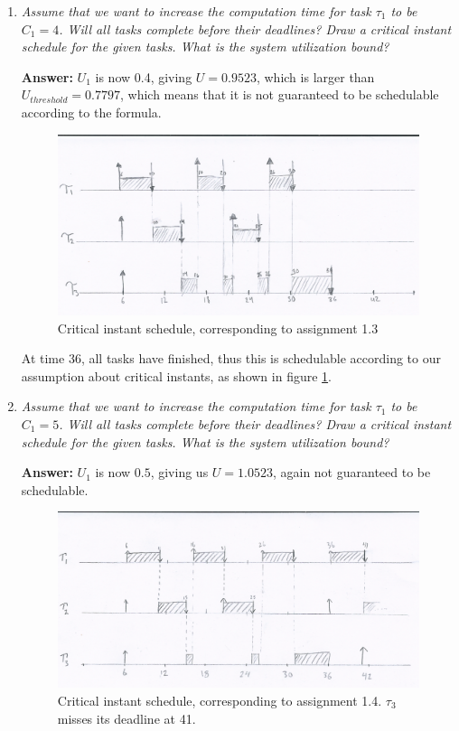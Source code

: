 \documentclass[a4paper,10pt]{article}
\newcommand{\answer}{\textbf{Answer: }}
\begin{document}
\begin{enumerate}
	\item \emph{Assume that we want to increase the computation time for task $\tau_1$ to be $C_1 = 4$. Will all tasks complete before their deadlines? Draw a critical instant schedule for the given tasks. What is the system utilization bound?}
	
	\answer $U_1$ is now 0.4, giving $U = 0.9523$, which is larger than $U_{threshold} = 0.7797$, which means that it is not guaranteed to be schedulable according to the formula.

	\begin{figure}
	\includegraphics[scale=0.4]{1_3_low}
	\caption{Critical instant schedule, corresponding to assignment 1.3}
	\label{1_3}
	\end{figure}

	At time 36, all tasks have finished, thus this is schedulable according to our assumption about critical instants, as shown in figure \ref{1_3}.
	
	\item \emph{Assume that we want to increase the computation time for task $\tau_1$ to be $C_1 = 5$. Will all tasks complete before their deadlines? Draw a critical instant schedule for the given tasks. What is the system utilization bound?}
	
	\answer $U_1$ is now $0.5$, giving us $U = 1.0523$, again not guaranteed to be schedulable.
	
	\begin{figure}
	\includegraphics[scale=0.4]{1_4_low}
	\caption{Critical instant schedule, corresponding to assignment 1.4. $\tau_3$ misses its deadline at 41.}
	\label{1_4}
	\end{figure}
	

\end{enumerate}
\end{document}
